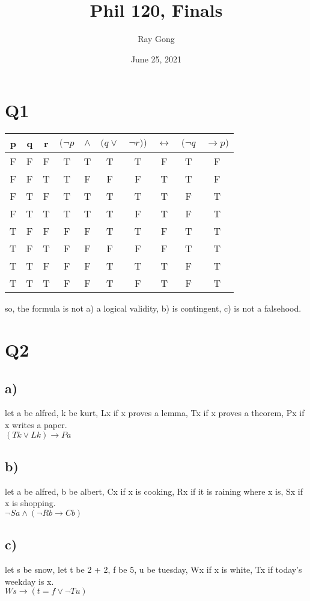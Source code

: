 \documentclass{article}
\title{Phil 120, Finals}
\author{Ray Gong}
\date{June 25, 2021}
\begin{document}
\maketitle
\newpage
\Large

\section*{Q1}
\begin{tabular}{c c c | c c c c c c c}
    p & q & r & $(\lnot p$ & $\wedge$ & $(q \vee$ & $\lnot r ))$ & $\leftrightarrow$ & $(\lnot q$ & $\rightarrow p)$\\
    \hline
    F & F & F & T & T & T& T & F & T & F\\
    F & F & T & T & F & F& F & T & T & F\\
    F & T & F & T & T & T& T & T & F & T\\
    F & T & T & T & T & T& F & T & F & T\\
    T & F & F & F & F & T& T & F & T & T\\
    T & F & T & F & F & F& F & F & T & T\\
    T & T & F & F & F & T& T & T & F & T\\
    T & T & T & F & F & T& F & T & F & T\\
\end{tabular}

so, the formula is not a) a logical validity, b) is contingent, c) is not a falsehood.


\section*{Q2}
\subsection*{a)}
let a be alfred, k be kurt, Lx if x proves a lemma, Tx if x proves a theorem, Px if x writes a paper.\\
$(Tk \vee Lk) \rightarrow Pa$

\subsection*{b)}
let a be alfred, b be albert, Cx if x is cooking, Rx if it is raining where x is, Sx if x is shopping.\\
$\lnot Sa \wedge (\lnot Rb \rightarrow Cb)$

\subsection*{c)}
let s be snow, let t be 2 + 2, f be 5, u be tuesday,  Wx if x is white, Tx if today's weekday is x.\\
$Ws \rightarrow (t = f \vee \lnot Tu)$
\end{document}
